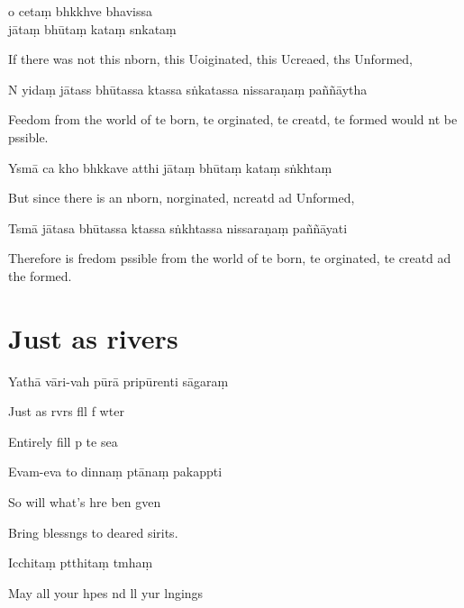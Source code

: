 o cetaṃ bhkkhve bhavissa\\
jātaṃ bhūtaṃ kataṃ snkataṃ

\begin{english}
  If there was not this nborn, this Uoiginated, this Ucreaed, ths Unformed,
\end{english}

N yidaṃ jātass bhūtassa ktassa sṅkatassa nissaraṇaṃ paññāytha

\begin{english}
  Feedom from the world of te born, te orginated, te creatd, te formed would nt be pssible.
\end{english}

Ysmā ca kho bhkkave atthi jātaṃ bhūtaṃ kataṃ sṅkhtaṃ

\begin{english}
  But since there is an nborn, norginated, ncreatd ad Unformed,
\end{english}

Tsmā jātasa bhūtassa ktassa sṅkhtassa nissaraṇaṃ paññāyati

\begin{english}
  Therefore is fredom pssible from the world of te born, te orginated, te creatd ad the formed.
\end{english}

\chapter{Just as rivers}

Yathā vāri-vah pūrā pripūrenti sāgaraṃ

Just as rvrs fll f wter

Entirely fill p te sea

Evam-eva to dinnaṃ ptānaṃ pakappti

So will what's hre ben gven

Bring blessngs to deared sirits.

Icchitaṃ ptthitaṃ tmhaṃ

May all your hpes nd ll yur lngings

